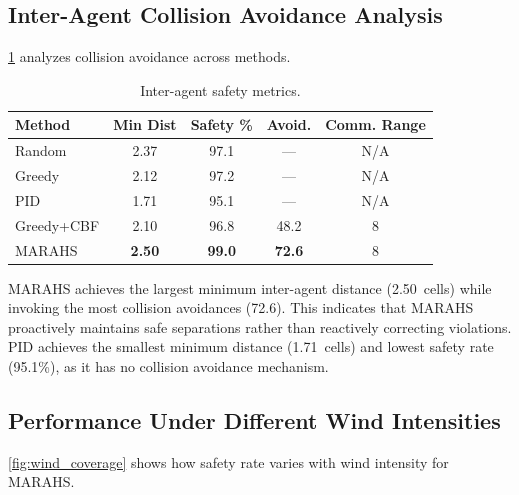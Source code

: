 \documentclass[11pt,twocolumn]{article}
\providecommand{\Cref}[1]{\ref{#1}}
\theoremstyle{definition}
\begin{document}
\subsection{Inter-Agent Collision Avoidance Analysis}
\label{sec:collision_analysis}

\Cref{tab:collision} analyzes collision avoidance across methods.

\begin{table}[t]
\centering
\caption{Inter-agent safety metrics.}
\label{tab:collision}
\small
\begin{tabular}{lcccc}
\toprule
\textbf{Method} & \textbf{Min Dist} & \textbf{Safety \%} & \textbf{Avoid.} & \textbf{Comm. Range} \\
\midrule
Random    & 2.37 & 97.1 & ---  & N/A \\
Greedy    & 2.12 & 97.2 & ---  & N/A \\
PID       & 1.71 & 95.1 & ---  & N/A \\
Greedy+CBF& 2.10 & 96.8 & 48.2 & 8 \\
MARAHS    & \textbf{2.50} & \textbf{99.0} & \textbf{72.6} & 8 \\
\bottomrule
\end{tabular}
\end{table}

MARAHS achieves the largest minimum inter-agent distance (2.50~cells) while invoking the most collision avoidances (72.6). This indicates that MARAHS proactively maintains safe separations rather than reactively correcting violations. PID achieves the smallest minimum distance (1.71~cells) and lowest safety rate (95.1\%), as it has no collision avoidance mechanism.

\subsection{Performance Under Different Wind Intensities}
\label{sec:wind_analysis}

\Cref{fig:wind_coverage} shows how safety rate varies with wind intensity for MARAHS.
\end{document}
